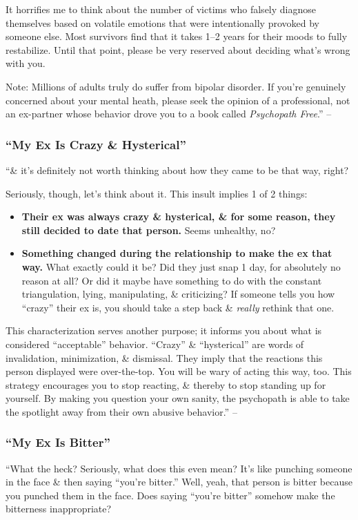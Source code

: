 \documentclass{article}
\numberwithin{equation}{section}
\begin{document}
It horrifies me to think about the number of victims who falsely diagnose themselves based on volatile emotions that were intentionally provoked by someone else. Most survivors find that it takes 1--2 years for their moods to fully restabilize. Until that point, please be very reserved about deciding what's wrong with you.

Note: Millions of adults truly do suffer from bipolar disorder. If you're genuinely concerned about your mental heath, please seek the opinion of a professional, not an ex-partner whose behavior drove you to a book called \textit{Psychopath Free}.'' -- \cite[p. 32]{MacKenzie2015}

\subsubsection{``My Ex Is Crazy \& Hysterical''}
``\& it's definitely not worth thinking about how they came to be that way, right?

Seriously, though, let's think about it. This insult implies 1 of 2 things:
\begin{itemize}
	\item \textbf{Their ex was always crazy \& hysterical, \& for some reason, they still decided to date that person.} Seems unhealthy, no?
	\item \textbf{Something changed during the relationship to make the ex that way.} What exactly could it be? Did they just snap 1 day, for absolutely no reason at all? Or did it maybe have something to do with the constant triangulation, lying, manipulating, \& criticizing? If someone tells you how ``crazy'' their ex is, you should take a step back \& \textit{really} rethink that one.
\end{itemize}
This characterization serves another purpose; it informs you about what is considered ``acceptable'' behavior. ``Crazy'' \& ``hysterical'' are words of invalidation, minimization, \& dismissal. They imply that the reactions this person displayed were over-the-top. You will be wary of acting this way, too. This strategy encourages you to stop reacting, \& thereby to stop standing up for yourself. By making you question your own sanity, the psychopath is able to take the spotlight away from their own abusive behavior.'' -- \cite[p. 33]{MacKenzie2015}

\subsubsection{``My Ex Is Bitter''}
``What the heck? Seriously, what does this even mean? It's like punching someone in the face \& then saying ``you're bitter.'' Well, yeah, that person is bitter because you punched them in the face. Does saying ``you're bitter'' somehow make the bitterness inappropriate?
\end{document}
